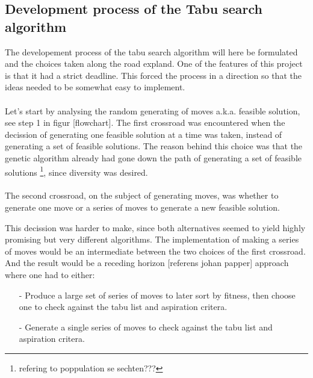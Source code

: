 \subsection{Development process of the Tabu search algorithm}
The developement process of the tabu search algorithm will here be formulated and the choices taken along the road expland. One of the features of this project is that it had a strict deadline. This forced the process in a direction so that the ideas needed to be somewhat easy to implement. \\
\\
Let's start by analysing the random generating of moves a.k.a. feasible solution, see step 1 in figur [flowchart]. The first crossroad was encountered when the decission of generating one feasible solution at a time was taken, instead of generating a set of feasible solutions. The reason behind this choice was that the genetic algorithm already had gone down the path of generating a set of feasible solutions \footnote{ refering to poppulation se sechten???}, since diversity was desired.\\
\\The second crossroad, on the subject of generating moves, was whether to generate one move or a series of moves to generate a new feasible solution. 

This decission was harder to make, since both alternatives seemed to yield highly promising but very different algorithms. The implementation of making a series of moves would be an intermediate between the two choices of the first crossroad. And the result would be a receding horizon [referens johan papper] approach where one had to either:
\begin{itemize}
\item[-]{}Produce a large set of series of moves to later sort by fitness, then choose one to check against the tabu list and aspiration critera.
\item[-]{}Generate a single series of moves to check against the tabu list and aspiration critera.
\end{itemize}

